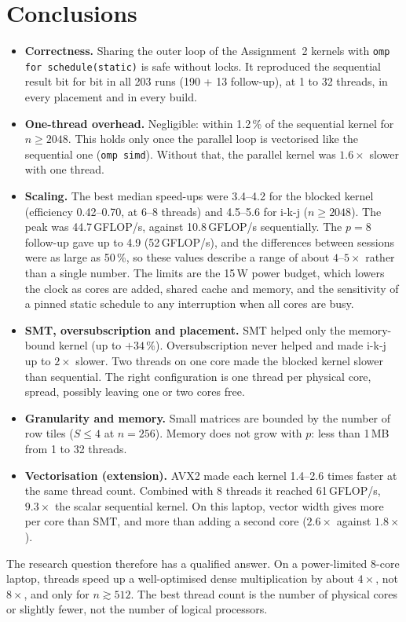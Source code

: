 \documentclass[11pt,a4paper]{article}
\begin{document}
\section{Conclusions}

\begin{itemize}[leftmargin=1.4em]
  \item \textbf{Correctness.} Sharing the outer loop of the Assignment~2 kernels with
        \texttt{omp for schedule(static)} is safe without locks. It reproduced the sequential
        result bit for bit in all 203 runs (190 + 13 follow-up), at 1 to 32 threads, in every placement and in every
        build.
  \item \textbf{One-thread overhead.} Negligible: within 1.2\,\% of the sequential kernel for
        $n\ge2048$. This holds only once the parallel loop is vectorised like the sequential
        one (\texttt{omp simd}). Without that, the parallel kernel was $1.6\times$ slower with
        one thread.
  \item \textbf{Scaling.} The best median speed-ups were 3.4--4.2 for the blocked kernel
        (efficiency 0.42--0.70, at 6--8 threads) and 4.5--5.6 for i-k-j ($n\ge2048$). The peak
        was 44.7\,GFLOP/s, against 10.8\,GFLOP/s sequentially. The $p=8$ follow-up gave up to
        4.9 (52\,GFLOP/s), and the differences between sessions were as large as 50\,\%, so
        these values describe a range of about $4$--$5\times$ rather than a single
        number. The limits are the 15\,W power
        budget, which lowers the clock as cores are added, shared cache and memory, and the
        sensitivity of a pinned static schedule to any interruption when all cores are
        busy.
  \item \textbf{SMT, oversubscription and placement.} SMT helped only the memory-bound kernel
        (up to $+34\,\%$). Oversubscription never helped and made i-k-j up to $2\times$ slower.
        Two threads on one core made the blocked kernel slower than sequential. The right
        configuration is one thread per physical core, spread, possibly leaving one or two
        cores free.
  \item \textbf{Granularity and memory.} Small matrices are bounded by the number of row tiles
        ($S\le4$ at $n=256$). Memory does not grow with $p$: less than 1\,MB from 1 to 32
        threads.
  \item \textbf{Vectorisation (extension).} AVX2 made each kernel 1.4--2.6 times faster at the
        same thread count. Combined with 8 threads it reached 61\,GFLOP/s, $9.3\times$ the
        scalar sequential kernel. On this laptop, vector width gives more per core than SMT,
        and more than adding a second core ($2.6\times$ against $1.8\times$).
\end{itemize}
The research question therefore has a qualified answer. On a power-limited 8-core laptop,
threads speed up a well-optimised dense multiplication by about $4\times$, not $8\times$, and
only for $n\gtrsim512$. The best thread count is the number of physical cores or slightly
fewer, not the number of logical processors.
\end{document}
